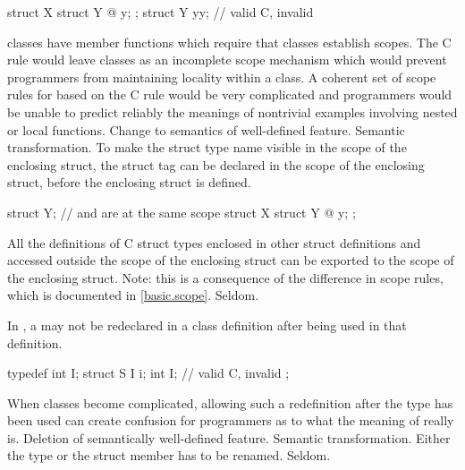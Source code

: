 \begin{example}
\begin{codeblock}
struct X {
  struct Y { @\commentellip@ } y;
};
struct Y yy;                    // valid C, invalid \Cpp{}
\end{codeblock}
\end{example}
\rationale
\Cpp{} classes have member functions which require that classes
establish scopes.
The C rule would leave classes as an incomplete scope mechanism
which would prevent \Cpp{} programmers from maintaining locality
within a class.
A coherent set of scope rules for \Cpp{} based on the C rule would
be very complicated and \Cpp{} programmers would be unable to predict
reliably the meanings of nontrivial examples involving nested or
local functions.
\effect
Change to semantics of well-defined feature.
\difficulty
Semantic transformation.
To make the struct type name visible in the scope of the enclosing
struct, the struct tag can be declared in the scope of the
enclosing struct, before the enclosing struct is defined.
\begin{example}
\begin{codeblock}
struct Y;                       //  and  are at the same scope
struct X {
  struct Y { @\commentellip@ } y;
};
\end{codeblock}
\end{example}

All the definitions of C struct types enclosed in other struct
definitions and accessed outside the scope of the enclosing
struct can be exported to the scope of the enclosing struct.
Note: this is a consequence of the difference in scope rules,
which is documented in \ref{basic.scope}.
\howwide
Seldom.

\change
In \Cpp{}, a  may not be redeclared in a class definition after being used in that definition.

\begin{example}
\begin{codeblock}
typedef int I;
struct S {
  I i;
  int I;            // valid C, invalid \Cpp{}
};
\end{codeblock}
\end{example}
\rationale
When classes become complicated, allowing such a redefinition
after the type has been used can create confusion for \Cpp{}
programmers as to what the meaning of  really is.
\effect
Deletion of semantically well-defined feature.
\difficulty
Semantic transformation.
Either the type or the struct member has to be renamed.
\howwide
Seldom.


